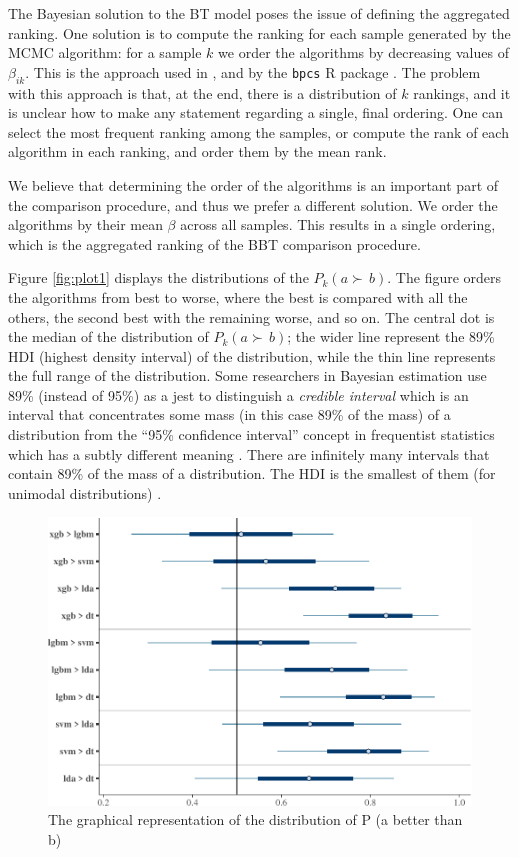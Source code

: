 \documentclass[twoside,11pt,preprint]{article}
\begin{document}
The Bayesian solution to the BT model poses the issue of defining
the aggregated ranking. One solution is to compute the ranking for
each sample generated by the MCMC algorithm: for a sample \(k\) we order
the algorithms by decreasing values of \(\beta_{ik}\). This is the
approach used in \citet{btstan}, and by the \texttt{bpcs} R package
\citep{issa2021bayesian}. The problem with this approach is that, at the
end, there is a distribution of \(k\) rankings, and it is unclear how to
make any statement regarding a single, final ordering. One can select
the most frequent ranking among the samples, or compute the rank of
each algorithm in each ranking, and order them by the mean rank.

We believe that determining the order of the algorithms is an
important part of the comparison procedure, and thus we prefer a
different solution. We order the algorithms by their mean \(\beta\)
across all samples. This results in a single ordering, which is the
aggregated ranking of the BBT comparison procedure.

Figure \ref{fig:plot1} displays the distributions of the \(P_k(a \succ\,b)\). The figure orders the algorithms from best to worse,
where the best is compared with all the others, the second best with
the remaining worse, and so on. The central dot is the median of the
distribution of \(P_k(a \succ\,b)\); the wider line represent the 89\%
HDI (highest density interval) of the distribution, while the thin
line represents the full range of the distribution. Some researchers
in Bayesian estimation use 89\% (instead of 95\%) as a jest to
distinguish a \emph{credible interval} which is an interval that
concentrates some mass (in this case 89\% of the mass) of a distribution from the
``95\% confidence interval'' concept in frequentist statistics which has
a subtly different meaning \citep{makowski2019bayestestr}. There are
infinitely many intervals that contain 89\% of the mass of a
distribution. The HDI is the smallest of them (for unimodal
distributions) \citep{kruschke2014doing}.

\begin{figure}
\includegraphics[width=0.7\linewidth]{figure_latex/xplot1-1} \caption{\label{fig:plot1}The graphical representation of the distribution of P (a better than b)}\label{fig:xplot1}
\end{figure}
\end{document}

